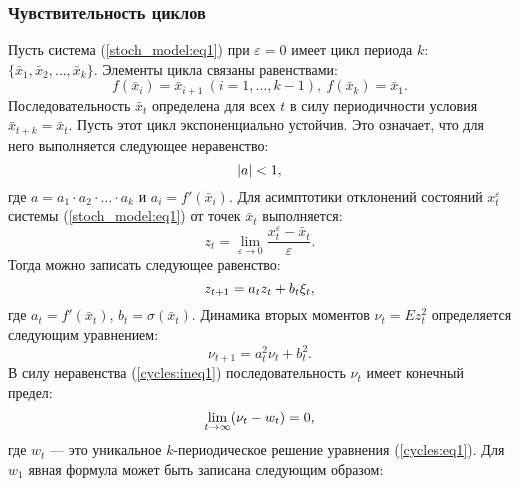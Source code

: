 \documentclass[a4paper, 14pt]{extreport}
\newcommand\abs[1]{\left|#1\right|}
\numberwithin{equation}{section}
\numberwithin{figure}{section}
\numberwithin{table}{section}
\begin{document}
			\subsubsection{Чувствительность циклов}
			\label{stoch_cycle_sensivity}
				Пусть система (\ref{stoch_model:eq1}) при $ \varepsilon = 0 $ имеет цикл периода $ k $: $ \{\bar{x}_{1}, \bar{x}_{2}, \ldots, \bar{x}_{k}\} $. Элементы цикла связаны равенствами:
				\begin{equation}
					f(\bar{x}_{i}) = \bar{x}_{i + 1}~(i = 1, \ldots, k - 1),~f(\bar{x}_{k}) = \bar{x}_{1}.
				\end{equation}
				Последовательность $ \bar{x}_{t} $ определена для всех $ t $ в силу периодичности условия $ \bar{x}_{t + k} = \bar{x}_{t} $. Пусть этот цикл экспоненциально устойчив. Это означает, что для него выполняется следующее неравенство:
				\begin{equation}
				\label{cycles:ineq1}
					\abs{a} < 1, \\[1mm]
				\end{equation}
                где $ a = a_{1} \cdot a_{2} \cdot \ldots \cdot a_{k} $ и $ a_{i} = f'(\bar{x}_{i}) $.
				Для асимптотики отклонений состояний $ x^{\varepsilon}_{t} $ системы (\ref{stoch_model:eq1}) от точек $ \bar{x}_{t} $ выполняется:
				\begin{equation}
					z_{t} = \lim_{\varepsilon \to 0} \frac{x^{\varepsilon}_{t} - \bar{x}_{t}}{\varepsilon}.
				\end{equation}
				Тогда можно записать следующее равенство:
				\begin{equation}
					z_{t + 1} = a_{t} z_{t} + b_{t} \xi_{t}, \\[1mm]
				\end{equation}
				где $ a_{t} = f'(\bar{x}_{t}) $, $ b_{t} = \sigma(\bar{x}_{t}) $. Динамика вторых моментов $ \nu_{t} = Ez^{2}_{t} $ определяется следующим уравнением: %
				\begin{equation}
				\label{cycles:eq1}
					\nu_{t + 1} = a^{2}_{t} \nu_{t} + b^{2}_{t}.
				\end{equation}
				В силу неравенства (\ref{cycles:ineq1}) последовательность $ \nu_{t} $ имеет конечный предел:
				\begin{equation}
					\lim_{t \to \infty} (\nu_{t} - w_{t}) = 0, \\[1mm]
				\end{equation}
				где $ w_{t} $ --- это уникальное $ k $-периодическое решение уравнения (\ref{cycles:eq1}). Для $ w_{1} $ явная формула может быть записана следующим образом:
\end{document}
